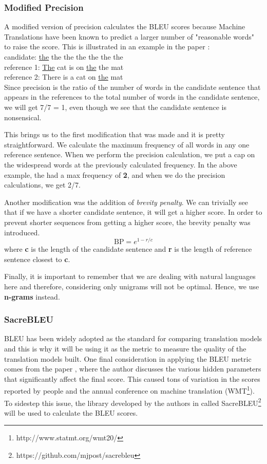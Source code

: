 \documentclass[12pt,a4paper,twoside,openright]{report}
\newcommand{\changedFont}[1]{{\fontfamily{qcr}\selectfont #1}}
\begin{document}
\subsubsection{Modified Precision}
A modified version of precision calculates the BLEU scores because Machine Translations have been known to predict a larger number of "reasonable words" to raise the score. This is illustrated in an example in the paper \cite{bleu}: \\
candidate: \changedFont{\underline{the} the the the the the the}\\
reference 1: \changedFont{\underline{The} cat is on \underline{the} the mat}\\
reference 2: \changedFont{There is a cat on \underline{the} mat}\\
Since precision is the ratio of the number of words in the candidate sentence that appears in the references to the total number of words in the candidate sentence, we will get 7/7 = 1, even though we see that the candidate sentence is nonsensical.

This brings us to the first modification that was made and it is pretty straightforward. We calculate the maximum frequency of all words in any one reference sentence. When we perform the precision calculation, we put a cap on the widespread words at the previously calculated frequency. In the above example, \changedFont{the} had a max frequency of \textbf{2}, and when we do the precision calculations, we get 2/7.

Another modification was the addition of \textit{brevity penalty}. We can trivially see that if we have a shorter candidate sentence, it will get a higher score. In order to prevent shorter sequences from getting a higher score, the brevity penalty was introduced.
\[ \text{BP} = e^{1-r/c}\]
where \textbf{c} is the length of the candidate sentence and \textbf{r} is the length of reference sentence closest to \textbf{c}.

Finally, it is important to remember that we are dealing with natural languages here and therefore, considering only unigrams will not be optimal. Hence, we use \textbf{n-grams} instead.

\subsubsection{SacreBLEU}
BLEU has been widely adopted as the standard for comparing translation models and this is why it will be using it as the metric to measure the quality of the translation models built. One final consideration in applying the BLEU metric comes from the paper \cite{sacrebleu}, where the author discusses the various hidden parameters that significantly affect the final score. This caused tons of variation in the scores reported by people and the annual conference on machine translation (WMT\footnote{http://www.statmt.org/wmt20/}). To sidestep this issue, the library developed by the authors in \cite{sacrebleu} called SacreBLEU\footnote{https://github.com/mjpost/sacrebleu} will be used to calculate the BLEU scores.
\end{document}
